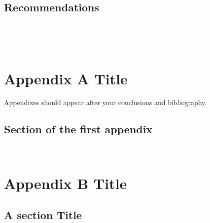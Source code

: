 \documentclass[11pt]{report}
\numberwithin{equation}{chapter}		%
\numberwithin{figure}{chapter}			%
\numberwithin{table}{chapter}			%
\begin{document}
\section{Recommendations}
\lipsum[3]

\newpage
\thispagestyle{empty} \ \newpage

\printbibliography[title=References]

\newpage
\thispagestyle{empty} \ \newpage


\appendix
\chapter{Appendix A Title}
Appendixes should appear after your conclusions and bibliography.
\section{Section of the first appendix}
\lipsum[3]


\newpage
\thispagestyle{empty} \ \newpage
\chapter{Appendix B Title}
\lipsum[2]

\section{A section Title}
\lipsum[3]
\end{document}
